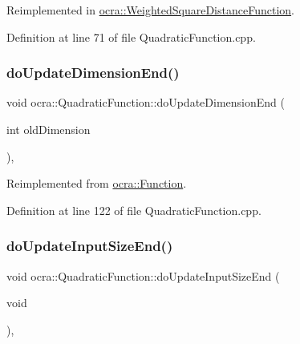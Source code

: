 Reimplemented in \hyperlink{classocra_1_1WeightedSquareDistanceFunction_afd6f2e03701395eed4db1b72588562ed}{ocra\+::\+Weighted\+Square\+Distance\+Function}.



Definition at line 71 of file Quadratic\+Function.\+cpp.

\hypertarget{classocra_1_1QuadraticFunction_ad9b92a56e1c91c33630a5ba3f118c7b9}{}\label{classocra_1_1QuadraticFunction_ad9b92a56e1c91c33630a5ba3f118c7b9} 
\subsubsection{\texorpdfstring{do\+Update\+Dimension\+End()}{doUpdateDimensionEnd()}}
{\footnotesize\ttfamily void ocra\+::\+Quadratic\+Function\+::do\+Update\+Dimension\+End (\begin{DoxyParamCaption}\item[{int}]{old\+Dimension }\end{DoxyParamCaption})\hspace{0.3cm}{\ttfamily [protected]}, {\ttfamily [virtual]}}



Reimplemented from \hyperlink{classocra_1_1Function_a17aa280f0e6eff4a7569edc373a5147d}{ocra\+::\+Function}.



Definition at line 122 of file Quadratic\+Function.\+cpp.

\hypertarget{classocra_1_1QuadraticFunction_ab3d5478fd8ded343453e0489c595e580}{}\label{classocra_1_1QuadraticFunction_ab3d5478fd8ded343453e0489c595e580} 
\subsubsection{\texorpdfstring{do\+Update\+Input\+Size\+End()}{doUpdateInputSizeEnd()}}
{\footnotesize\ttfamily void ocra\+::\+Quadratic\+Function\+::do\+Update\+Input\+Size\+End (\begin{DoxyParamCaption}\item[{void}]{ }\end{DoxyParamCaption})\hspace{0.3cm}{\ttfamily [protected]}, {\ttfamily [virtual]}}



